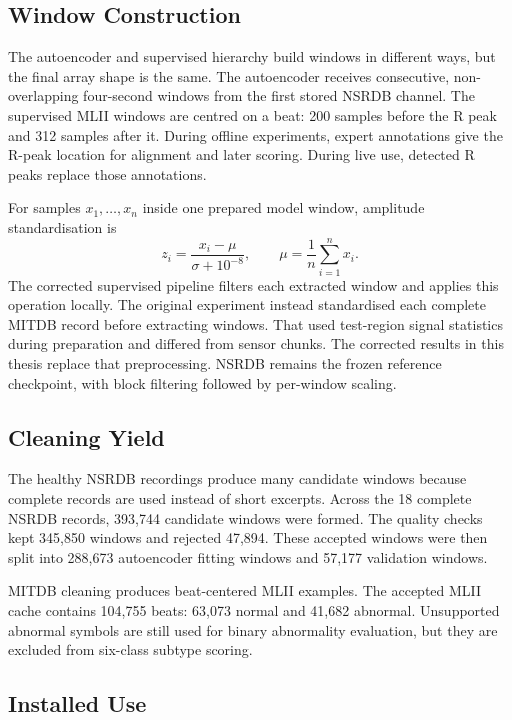 \subsection{Window Construction}

The autoencoder and supervised hierarchy build windows in different ways, but
the final array shape is the same. The autoencoder receives consecutive,
non-overlapping four-second windows from the first stored NSRDB channel. The
supervised MLII windows are centred on a beat: 200 samples before the R peak
and 312 samples after it. During offline experiments, expert annotations give
the R-peak location for alignment and later scoring. During live use, detected
R peaks replace those annotations.

For samples $x_1,\ldots,x_n$ inside one prepared model window, amplitude
standardisation is
\begin{equation}
 z_i=\frac{x_i-\mu}{\sigma+10^{-8}},\qquad
 \mu=\frac{1}{n}\sum_{i=1}^{n}x_i.
\end{equation}
The corrected supervised pipeline filters each extracted window and applies
this operation locally. The original experiment instead standardised each
complete MITDB record before extracting windows. That used test-region signal
statistics during preparation and differed from sensor chunks. The corrected
results in this thesis replace that preprocessing. NSRDB remains the frozen
reference checkpoint, with block filtering followed by per-window scaling.

\subsection{Cleaning Yield}

The healthy NSRDB recordings produce many candidate windows because complete
records are used instead of short excerpts. Across the 18 complete NSRDB
records, 393,744 candidate windows were formed. The quality checks kept 345,850
windows and rejected 47,894. These accepted windows were then split into
288,673 autoencoder fitting windows and 57,177 validation windows.

MITDB cleaning produces beat-centered MLII examples. The accepted MLII cache
contains 104,755 beats: 63,073 normal and 41,682 abnormal. Unsupported abnormal
symbols are still used for binary abnormality evaluation, but they are excluded
from six-class subtype scoring.

\subsection{Installed Use}

